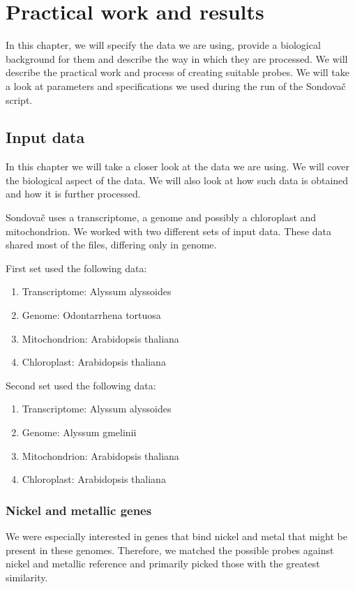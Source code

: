 \chapter[Practical work and results]{Practical work and results}
\label{kap:practical_work}

In this chapter,  we will specify the data we are using, provide a biological background for them and describe the way in which they are processed. 
We will describe the practical work and process of creating suitable probes. We will take a look at parameters and specifications we used during the 
run of the Sondovač script. 

\section{Input data}
In this chapter we will take a closer look at the data we are using. We will cover the biological aspect of 
the data. %
We will also look at how such data is obtained and how it is further processed. 

Sondovač uses a transcriptome, a genome and possibly a chloroplast and mitochondrion. 
We worked with two different sets of input data. These data shared most of the files, differing only in genome. 

First set used the following data: 

\begin{enumerate}
\item Transcriptome: Alyssum alyssoides
\item Genome: Odontarrhena tortuosa
\item Mitochondrion: Arabidopsis thaliana
\item Chloroplast: Arabidopsis thaliana
\end{enumerate}

Second set used the following data: 

\begin{enumerate}
\item Transcriptome: Alyssum alyssoides
\item Genome: Alyssum gmelinii
\item Mitochondrion: Arabidopsis thaliana
\item Chloroplast: Arabidopsis thaliana
\end{enumerate}

\subsection{Nickel and metallic genes}
We were especially interested in genes that bind nickel and metal that might be present in these genomes. Therefore, we matched the possible 
probes against nickel and metallic reference and primarily picked those with the greatest similarity. 

